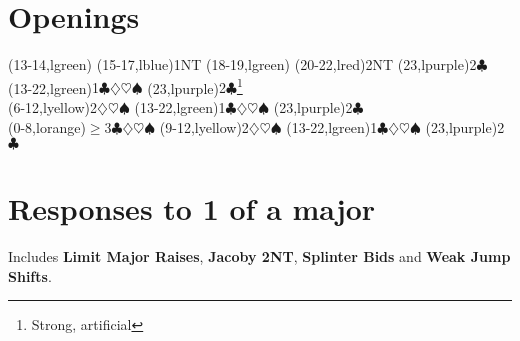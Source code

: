 \documentclass{article}
\def\C{$\clubsuit$}
\def\D{$\diamondsuit$}
\def\H{$\heartsuit$}
\def\S{$\spadesuit$}
\let\TeXge\ge
\def\ge{$\TeXge$}
\begin{document}
\def\oc#1#2{\@@bid{#1}{lorange}{}}
\def\yc#1#2{\@@bid{#1}{lyellow}{}}
\def\gc#1#2{\@@bid{#1}{lgreen}{}}
\def\bc#1#2{\@@bid{#1}{lblue}{}}
\def\pc#1#2{\@@bid{#1}{lred}{}}
\def\vc#1#2{\@@bid{#1}{lpurple}{}}
\def\ac#1#2{\@@bid{#1}{laqua}{}}

\def\ic{\futurelet\@foo\@ic}
\def\@ic{\let\@next\g@ic\ifx\@foo\egroup\let\@next\relax\fi\@next}
\def\g@ic#1{\futurelet\@foo\@ic}

\def\ditto#1{\raise 0.18pc\hbox to #1{\leaders\hrule\hfill\lower 0.4pc\hbox{\kern1ex''\kern0.6ex}\leaders\hrule\hfill}}

\def\savenote#1#2{\begingroup\count@\value{footnote}\advance\count@\@ne\xdef#1{\the\count@}\endgroup\footnote{#2}}

\section{Openings}

\begin{ptable}
  \bid(13-14,lgreen){}
  \bid(15-17,lblue){1NT}
  \bid(18-19,lgreen){}
  \bid(20-22,lred){2NT}
  \bid*(23,lpurple){2\C}\\%
{}
  \bid*(13-22,lgreen){1\C\D\H\S}
  \bid(23,lpurple){2\C\footnote{Strong, artificial}}\\%
{}
  \bid(6-12,lyellow){2\D\H\S}
  \bid(13-22,lgreen){1\C\D\H\S}
  \bid*(23,lpurple){2\C}\\%
{}
  \bid(0-8,lorange){\ge3\C\D\H\S}
  \bid*(9-12,lyellow){2\D\H\S}
  \bid*(13-22,lgreen){1\C\D\H\S}
  \bid*(23,lpurple){2\C}\\
\end{ptable}

\section{Responses to 1 of a major}
Includes \textbf{Limit Major Raises}, \textbf{Jacoby 2NT},
\textbf{Splinter Bids} and \textbf{Weak Jump Shifts}.\\
\end{document}
